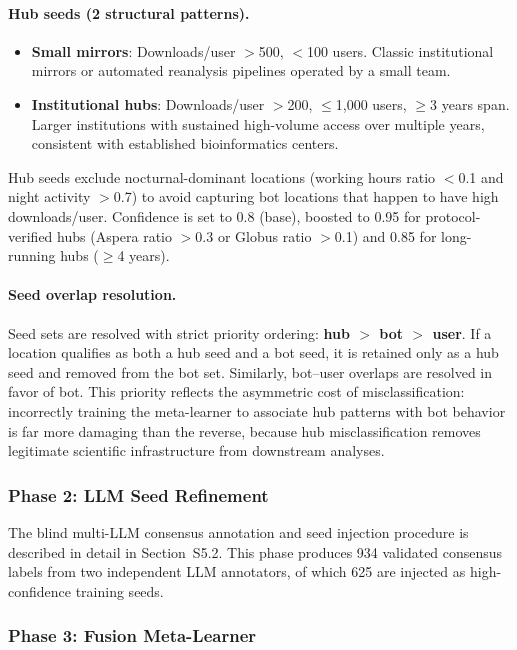\documentclass[11pt,a4paper]{article}
\begin{document}
\paragraph{Hub seeds (2 structural patterns).}
\begin{itemize}
    \item \textbf{Small mirrors}: Downloads/user $>$500, $<$100 users. Classic institutional mirrors or automated reanalysis pipelines operated by a small team.
    \item \textbf{Institutional hubs}: Downloads/user $>$200, $\leq$1,000 users, $\geq$3 years span. Larger institutions with sustained high-volume access over multiple years, consistent with established bioinformatics centers.
\end{itemize}

\noindent Hub seeds exclude nocturnal-dominant locations (working hours ratio $<$0.1 and night activity $>$0.7) to avoid capturing bot locations that happen to have high downloads/user. Confidence is set to 0.8 (base), boosted to 0.95 for protocol-verified hubs (Aspera ratio $>$0.3 or Globus ratio $>$0.1) and 0.85 for long-running hubs ($\geq$4 years).

\paragraph{Seed overlap resolution.} Seed sets are resolved with strict priority ordering: \textbf{hub $>$ bot $>$ user}. If a location qualifies as both a hub seed and a bot seed, it is retained only as a hub seed and removed from the bot set. Similarly, bot--user overlaps are resolved in favor of bot. This priority reflects the asymmetric cost of misclassification: incorrectly training the meta-learner to associate hub patterns with bot behavior is far more damaging than the reverse, because hub misclassification removes legitimate scientific infrastructure from downstream analyses.

\subsubsection{Phase 2: LLM Seed Refinement}

The blind multi-LLM consensus annotation and seed injection procedure is described in detail in Section~S5.2. This phase produces 934 validated consensus labels from two independent LLM annotators, of which 625 are injected as high-confidence training seeds.

\subsubsection{Phase 3: Fusion Meta-Learner}
\end{document}

